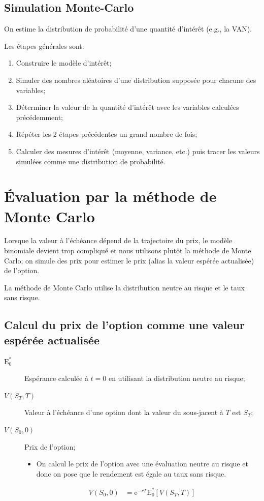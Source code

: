 \documentclass[10pt, french]{article}
\begin{document}
\begin{multicols*}{2}
\subsection*{Simulation Monte-Carlo}
On estime la distribution de probabilité d'une quantité d'intérêt (e.g., la VAN).

Les étapes générales sont:
\begin{enumerate}[leftmargin = *]
	\item	Construire le modèle d'intérêt;
	\item	Simuler des nombres aléatoires d'une distribution supposée pour chacune des variables;
	\item	Déterminer la valeur de la quantité d'intérêt avec les variables calculées précédemment;
	\item	Répéter les 2 étapes précédentes un grand nombre de fois;
	\item	Calculer des mesures d'intérêt (moyenne, variance, etc.) puis tracer les valeurs simulées comme une distribution de probabilité.
\end{enumerate}


\pagebreak
\section{Évaluation par la méthode de Monte Carlo}
Lorsque la valeur à l'échéance dépend de la trajectoire du prix, le modèle binomiale devient trop compliqué et nous utilisons plutôt la méthode de Monte Carlo; on simule des prix pour estimer le prix (alias la valeur espérée actualisée) de l'option.

La méthode de Monte Carlo utilise la distribution neutre au risque et le taux sans risque.

\subsection{Calcul du prix de l'option comme une valeur espérée actualisée}
\begin{distributions}[Notation]
\begin{description}
	\item[$\text{E}_{0}^{*}$]	Espérance calculée à $t	=	0$ en utilisant la distribution neutre au risque;
	\item[$V(S_{T}, T)$]	Valeur à l'échéance d'une option dont la valeur du sous-jacent à $T$ est $S_{T}$;
	\item[$V(S_{0}, 0)$]	Prix de l'option;
		\begin{itemize}[leftmargin = *]
		\item	On calcul le prix de l'option avec une évaluation neutre au risque et donc on pose que le rendement est égale au taux sans risque.
		\end{itemize}
		\begin{align*}
		V(S_{0}, 0)	
		&=	\textrm{e}^{-rT}\text{E}_{0}^{*}[V(S_{T}, T)]
		\end{align*}
\end{description}
\end{distributions}


\end{multicols*}
\end{document}
